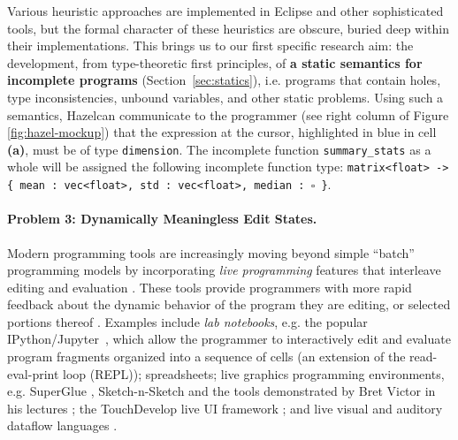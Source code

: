 \documentclass[letterpaper,USenglish]{lipics-v2016}
\let\li\lstinline
\newcommand{\Hazel}[0]{\textsf{Hazel}}
\newcommand{\HazelEnv}[0]{\Hazel}
\begin{document}
Various heuristic
approaches are implemented in Eclipse and other sophisticated tools, but the 
formal character of these heuristics are obscure, buried deep within their implementations. This brings us to our first specific research aim: the 
development, from type-theoretic first principles, of \textbf{a static semantics for incomplete programs} (Section~\ref{sec:statics}),
i.e. programs that contain holes, type inconsistencies, unbound variables, and
other static problems. Using such a semantics, \HazelEnv can 
communicate to the programmer (see right column of Figure \ref{fig:hazel-mockup}) that the expression at the cursor, highlighted in blue in cell \textbf{(a)}, must be of type \li{dimension}. The incomplete function
\li{summary_stats} as a whole will be assigned the following incomplete function
type: \texttt{matrix<float> -> \{ {mean} : vec<float>, std : vec<float>, median :~$\square$ \}}.

\paragraph{Problem 3: Dynamically Meaningless Edit States.} Modern programming
tools are increasingly moving beyond simple ``batch'' programming models by
incorporating \emph{live programming} features that interleave editing and
evaluation \cite{DBLP:conf/icse/Tanimoto13,DBLP:journals/vlc/Tanimoto90,McDirmid:2007:LUL:1297105.1297073}. These tools provide programmers with more rapid feedback about the
dynamic behavior of the program they are editing, or selected portions thereof \cite{McDirmid:2013:ULP:2509578.2509585}. Examples include \emph{lab notebooks},
e.g. the popular IPython/Jupyter~\cite{Perez:2007:ISI:1251563.1251831}, which allow the
programmer to interactively edit and evaluate program fragments organized into a
sequence of cells (an extension of the read-eval-print loop (REPL)); spreadsheets; {live graphics programming environments}, e.g. SuperGlue \cite{McDirmid:2007:LUL:1297105.1297073}, Sketch-n-Sketch \cite{DBLP:conf/pldi/ChughHSA16,DBLP:conf/icse/Chugh25} and the tools demonstrated by Bret Victor in his lectures \cite{victor2012inventing}; the TouchDevelop live UI framework \cite{burckhardt2013s}; and live visual and auditory dataflow languages \cite{DBLP:conf/vl/BurnettAW98}. 
\end{document}
